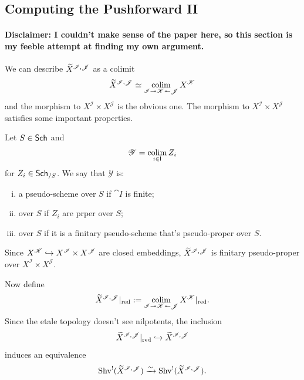 \documentclass[oneside]{amsart}
\newcommand{\CI}{\mathcal{I}}
\newcommand{\CY}{\mathcal{Y}}
\newcommand{\CJ}{\mathcal{J}}
\newcommand{\CK}{\mathcal{K}}
\begin{document}
\subsection{Computing the Pushforward II}
\paragraph{\textbf{Disclaimer:} I couldn't make sense of the paper here, so this section is my feeble attempt at finding my own argument.}

We can describe $\wt{X}^{\CI,\CJ}$ as a colimit
\[
	\wt{X}^{\CI,\CJ} \isoto \colim_{\CI\surjto\CK\surjfrom\CJ} X^{\CK}
\] 
and the morphism to $X^{\CI}\times X^{\CJ}$ is the obvious one. The morphism to $X^{\CI}\times X^{\CJ}$ satisfies some important properties.
\begin{definition}
	Let $S\in \mathsf{Sch}$ and
	\[
		\CY = \colim_{i\in \cat{I}}Z_i
	\] 
	for $Z_i\in \mathsf{Sch}_{/S}$. We say that $\CY$ is:
	\begin{enumerate}[(i)]
		\item a  pseudo-scheme over $S$ if $\cat{I}$ is finite;
		\item {} over $S$ if $Z_i$ are prper over $S$;
		\item {} over $S$ if it is a finitary pseudo-scheme that's pseudo-proper over $S$.
	\end{enumerate}
\end{definition}
Since $X^{\CK}\injto X^{\CI}\times X^{\CJ}$ are closed embeddings, $\wt{X}^{\CI,\CJ}$ is finitary pseudo-proper over $X^{\CI}\times X^{\CJ}$.

Now define
\[
	\wt{X}^{\CI,\CJ}|\red \defeq \colim_{\CI\surjto \CK \surjfrom \CJ}X^{\CK}|\red.
\] 
Since the etale topology doesn't see nilpotents, the inclusion
\[
	\wt{X}^{\CI,\CJ}|\red \injto \wt{X}^{\CI,\CJ}
\] 
induces an equivalence
\[
	\Shv^{!}(\wt{X}^{\CI,\CJ}) \simto \Shv^{!}(\wt{X}^{\CI,\CJ}).
\] 
\end{document}
